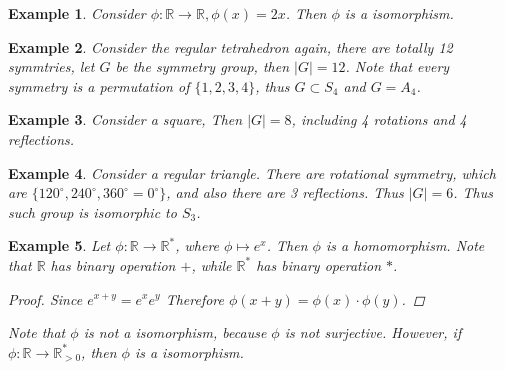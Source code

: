 \documentclass{article}
\theoremstyle{MyNonumberplain}
\theoremstyle{break}
\newtheorem*{proof}{Proof. }
\newcommand{\p}{\phi}
\theoremstyle{break}
\newtheorem{example}{Example}[section]
\theoremstyle{break}
\theoremstyle{definition}
\theoremstyle{break}
\begin{document}
\begin{expbox}
    \begin{example}
        Consider $\p : \mathbb{R} \rightarrow \mathbb{R}, \p (x) = 2 x$. Then $\p$ is a isomorphism.
    \end{example}
\end{expbox}

\begin{expbox}
    \begin{example}
        Consider the regular tetrahedron again, there are totally 12 symmtries, let
        $G$ be the symmetry group, then $| G | = 12$. Note that every symmetry is a
        permutation of $\{ 1, 2, 3, 4 \}$, thus $G \subset S_4$ and $G = A_4$.        
    \end{example}
\end{expbox}

\begin{expbox}
    \begin{example}
       
        Consider a square, Then $| G | = 8$, including 4 rotations and 4
        reflections. 
  
    \end{example}
\end{expbox}

\begin{expbox}
    \begin{example}
        Consider a regular triangle. There are rotational symmetry, which are $\{
        120^{\circ}, 240^{\circ}, 360^{\circ} = 0^{\circ} \}$, and also there are 3
        reflections. Thus $| G | = 6$. Thus such group is isomorphic to $S_3$.    
    \end{example}
\end{expbox}

\begin{expbox}
    \begin{example}
        Let $\p : \mathbb{R} \rightarrow \mathbb{R}^{\ast}$, where $\p \mapsto e^x$.
        Then $\p$ is a homomorphism. Note that $\mathbb{R}$ has binary operation $+$,
        while $\mathbb{R}^{\ast}$ has binary operation $\ast$.
        \begin{prfbox}
            \begin{proof}
                    Since $e^{x+y}=e^xe^y$
                    Therefore $\p (x + y) = \p (x) \cdot \p (y)$.
            \end{proof}
        \end{prfbox}
        Note that $\p$ is not a isomorphism, because $\p$ is not surjective. However,
        if $\p : \mathbb{R} \rightarrow \mathbb{R}^{\ast}_{> 0}$, then $\p$ is a
        isomorphism.
    \end{example}
\end{expbox}
\end{document}
